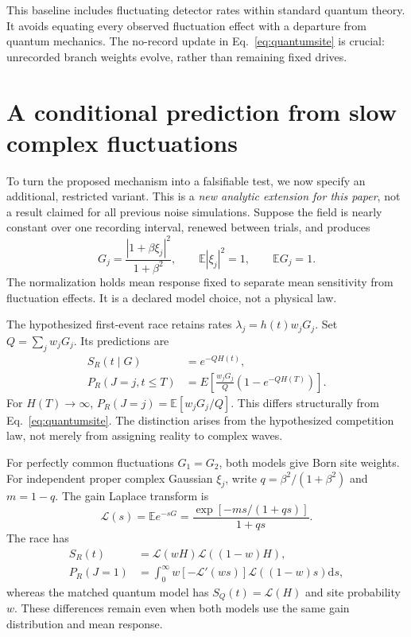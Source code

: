 \documentclass[11pt]{article}
\newcommand{\E}{\mathbb E}
\newcommand{\dd}{\mathrm d}
\begin{document}
This baseline includes fluctuating detector rates within standard quantum theory. It avoids equating every observed fluctuation effect with a departure from quantum mechanics. The no-record update in Eq.~\eqref{eq:quantumsite} is crucial: unrecorded branch weights evolve, rather than remaining fixed drives.

\section{A conditional prediction from slow complex fluctuations}\label{sec:prediction}
To turn the proposed mechanism into a falsifiable test, we now specify an additional, restricted variant. This is a \emph{new analytic extension for this paper}, not a result claimed for all previous noise simulations. Suppose the field is nearly constant over one recording interval, renewed between trials, and produces
\begin{equation}\label{eq:gain}
 G_j=\frac{|1+\beta\xi_j|^2}{1+\beta^2},\qquad
 \E|\xi_j|^2=1,\qquad \E G_j=1.
\end{equation}
The normalization holds mean response fixed to separate mean sensitivity from fluctuation effects. It is a declared model choice, not a physical law.

The hypothesized first-event race retains rates $\lambda_j=h(t)w_jG_j$. Set $Q=\sum_jw_jG_j$. Its predictions are
\begin{align}
 S_R(t\mid G)&=e^{-QH(t)},\\
 P_R(J=j,t\leq T)&=E\left[\frac{w_jG_j}{Q}(1-e^{-QH(T)})\right].\label{eq:finite}
\end{align}
For $H(T)\rightarrow\infty$, $P_R(J=j)=\E[w_jG_j/Q]$. This differs structurally from Eq.~\eqref{eq:quantumsite}. The distinction arises from the hypothesized competition law, not merely from assigning reality to complex waves.

For perfectly common fluctuations $G_1=G_2$, both models give Born site weights. For independent proper complex Gaussian $\xi_j$, write $q=\beta^2/(1+\beta^2)$ and $m=1-q$. The gain Laplace transform is
\begin{equation}
 \mathcal L(s)=\E e^{-sG}=\frac{\exp[-ms/(1+qs)]}{1+qs}.
\end{equation}
The race has
\begin{align}
 S_R(t)&=\mathcal L(wH)\mathcal L((1-w)H),\\
 P_R(J=1)&=\int_0^\infty w[-\mathcal L'(ws)]\mathcal L((1-w)s)\dd s,\label{eq:integral}
\end{align}
whereas the matched quantum model has $S_Q(t)=\mathcal L(H)$ and site probability $w$. These differences remain even when both models use the same gain distribution and mean response.
\end{document}
